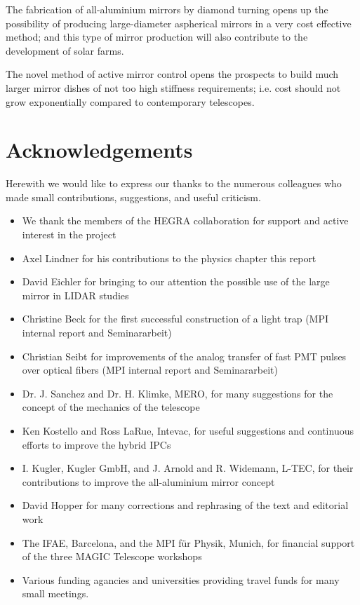 The fabrication of all-aluminium mirrors by diamond turning opens up the
possibility of producing large-diameter aspherical mirrors in a very cost
effective method; and this type of mirror production will also contribute to
the development of solar farms.

The novel method of active mirror control opens the prospects to build much
larger mirror dishes of not too high stiffness requirements; i.e. cost should
not grow exponentially compared to contemporary telescopes.

\cleardoublepage
\chapter{Acknowledgements}

Herewith we would like to express our thanks to the numerous colleagues
who made small contributions, suggestions, and useful criticism.
\begin{itemize}
\item
We thank the members of the HEGRA collaboration for support and active
interest in the project
\item
Axel Lindner for his contributions to the physics chapter this report
\item
David Eichler for bringing to our attention the possible use of the large
mirror in LIDAR studies
\item
Christine Beck for the first successful construction of a light trap (MPI
internal report and Seminararbeit)
\item 
Christian Seibt for improvements of the analog transfer of fast PMT pulses  over
optical fibers (MPI internal report and Seminararbeit)
\item
Dr. J. Sanchez and Dr. H. Klimke, MERO, for many suggestions for the concept of
the mechanics of the telescope
\item
Ken Kostello and Ross LaRue, Intevac, for useful suggestions and
continuous efforts to improve the hybrid IPCs
\item
I. Kugler, Kugler GmbH, and J. Arnold and R. Widemann, L-TEC, for their 
contributions to improve the all-aluminium mirror concept
\item
David Hopper for many corrections and rephrasing of the text and editorial work
\item
The IFAE, Barcelona, and the MPI f\"ur Physik, Munich, for financial support
of the three MAGIC Telescope workshops
\item
Various funding agancies and universities providing travel funds
for many small meetings.
\end{itemize}

